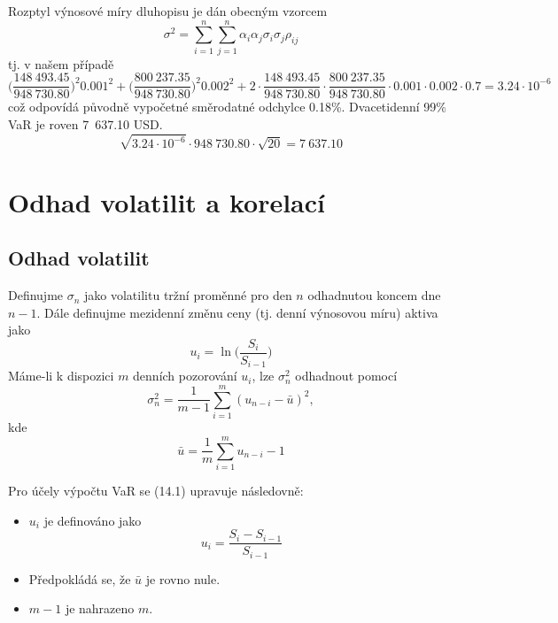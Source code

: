 \documentclass[a4paper]{book}
\begin{document}
Rozptyl výnosové míry dluhopisu je dán obecným vzorcem
\begin{equation*}
\sigma^2 = \sum_{i=1}^n \sum_{j=1}^n \alpha_i \alpha_j \sigma_i \sigma_j \rho_{ij}
\end{equation*}
tj. v našem případě
\begin{equation*}
\Big( \frac{148~493.45}{948~730.80} \Big)^2 0.001^2 + \Big( \frac{800~237.35}{948~730.80} \Big)^2 0.002^2 + 2 \cdot \frac{148~493.45}{948~730.80} \cdot \frac{800~237.35}{948~730.80} \cdot 0.001 \cdot 0.002 \cdot 0.7 = 3.24 \cdot 10^{-6}
\end{equation*}
což odpovídá původně vypočetné směrodatné odchylce 0.18\%. Dvacetidenní 99\% VaR je roven 7~637.10 USD.
\begin{equation*}
\sqrt{3.24 \cdot 10^{-6}} \cdot 948~730.80 \cdot \sqrt{20} = 7~637.10
\end{equation*}

\chapter{Odhad volatilit a korelací}

\section{Odhad volatilit}

Definujme $\sigma_n$ jako volatilitu tržní proměnné pro den $n$ odhadnutou koncem dne $n-1$. Dále definujme mezidenní změnu ceny (tj. denní výnosovou míru) aktiva jako
\begin{equation*}
u_i = \ln \Big(\frac{S_i}{S_{i-1}} \Big)
\end{equation*}
Máme-li k dispozici $m$ denních pozorování $u_i$, lze $\sigma_n^2$ odhadnout pomocí
\begin{equation}
\sigma_n^2 = \frac{1}{m-1} \sum_{i=1}^m (u_{n-i}-\bar{u})^2,
\end{equation}
kde
\begin{equation*}
\bar{u} = \frac{1}{m} \sum_{i=1}^m u_{n-i}-1
\end{equation*}

Pro účely výpočtu VaR se (14.1) upravuje následovně:
\begin{itemize}
\item $u_i$ je definováno jako
\begin{equation*}
u_i = \frac{S_i - S_{i-1}}{S_{i-1}}
\end{equation*}
\item Předpokládá se, že $\bar{u}$ je rovno nule.
\item $m-1$ je nahrazeno $m$.
\end{itemize}
\end{document}
